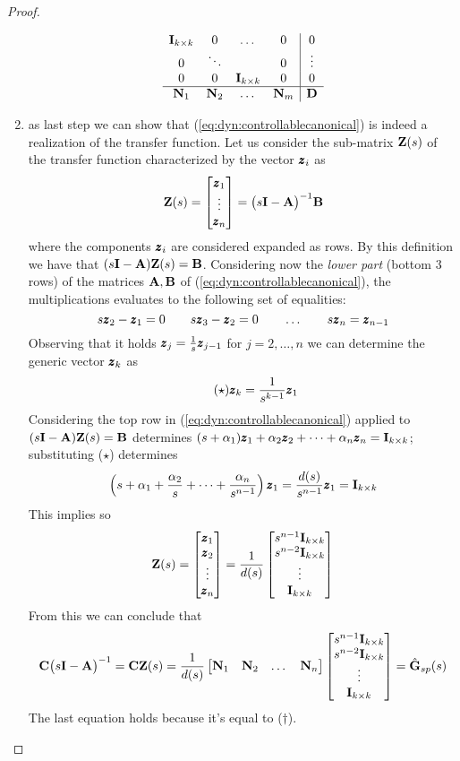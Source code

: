 \begin{proof}
\begin{enumerate}[\itshape a)]
\begin{equation}
{\begin{array}{ c c c c | c}
						\mathbf{I}_{k\times k} & 0 & \dots & 0 & 0 \\
						0 & \ddots & & 0 & \vdots \\
						0 & 0& \mathbf{I}_{k\times k} & 0 & 0 \\ \hline
						\mathbf{N}_1 & \mathbf{N}_2 & \dots & \mathbf{N}_m & \mathbf{D}\end{array}}
			\end{equation}
			\item as last step we can show that (\ref{eq:dyn:controllablecanonical}) is indeed a realization of the transfer function. Let us consider the sub-matrix $\mathbf{Z}(s)$ of the transfer function characterized by the vector $\pmb{z}_i$ as
			\[ \mathbf{Z}(s) = \begin{bmatrix} \pmb{z}_1 \\ \vdots \\ \pmb{z}_n \end{bmatrix} = \big(s\mathbf{I} - \mathbf{A}\big)^{-1} \mathbf{B} \]
			where the components $\pmb{z}_i$ are considered expanded as rows. By this definition we have that $(s\mathbf{I} - \mathbf{A}) \mathbf{Z}(s) = \mathbf{B}$. Considering now the \textit{lower part} (bottom 3 rows) of the matrices $\mathbf{A},\mathbf{B}$ of (\ref{eq:dyn:controllablecanonical}), the multiplications evaluates to the following set of equalities:
			\[ s\pmb{z}_2 - \pmb{z}_1 = 0 \qquad s\pmb{z}_3 - \pmb{z}_2 = 0 \qquad \dots \qquad s\pmb{z}_n = \pmb{z}_{n-1} \]
			Observing that it holds $\pmb{z}_j = \frac 1 s \pmb{z}_{j-1}$ for $j = 2,\dots, n$ we can determine the generic vector $\pmb{z}_k$ as
			\begin{equation} \tag{$\star$}
				\pmb{z}_k = \frac 1 {s^{k-1}} \pmb{z}_1
			\end{equation} 
			Considering the top row in (\ref{eq:dyn:controllablecanonical}) applied to $(s\mathbf{I} - \mathbf{A})\mathbf{Z}(s) = \mathbf{B}$ determines $(s+\alpha_1)\pmb{z}_1 + \alpha_2\pmb{z}_2+\dots+ \alpha_n \pmb{z}_n = \mathbf{I}_{k\times k}$; substituting ($\star$) determines
			\[ \left(s + \alpha_1 + \frac{\alpha_2}{s} + \dots + \frac{\alpha_n}{s^{n-1}}\right) \pmb{z}_1 = \frac{d(s)}{s^{n-1}} \pmb{z}_1 = \mathbf{I}_{k\times k} \]
			This implies so
			\[ \mathbf{Z}(s) =  \begin{bmatrix} \pmb{z}_1 \\ \pmb{z}_2 \\ \vdots \\ \pmb{z}_n \end{bmatrix} = \frac 1 {d(s)} \begin{bmatrix} s^{n-1} \mathbf{I}_{k\times k} \\ s^{n-2} \mathbf{I}_{k\times k} \\ \vdots \\ \mathbf{I}_{k\times k}  \end{bmatrix} \]
			From this we can conclude that
			\[ \mathbf{C}\big(s\mathbf{I}-\mathbf{A}\big)^{-1} = \mathbf{C} \mathbf{Z}(s) = \frac 1 {d(s)} \begin{bmatrix} \mathbf{N}_1 & \mathbf{N}_2 & \dots & \mathbf{N}_n \end{bmatrix} \begin{bmatrix} s^{n-1} \mathbf{I}_{k\times k} \\ s^{n-2} \mathbf{I}_{k\times k} \\ \vdots \\ \mathbf{I}_{k\times k}  \end{bmatrix}  = \hat {\mathbf{G}}_{sp}(s) \]
			The last equation holds because it's equal to ($\dagger$).
			
		\end{enumerate}
	\end{proof}
	
